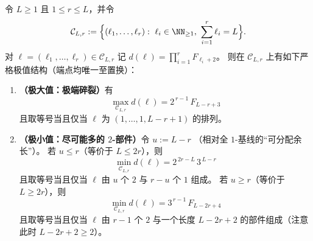 \begin{proposition}\label{prop:pom-multiplicity-fixed-r-extrema}
令 \(L\ge 1\) 且 \(1\le r\le L\)，并令
\[
\mathcal{C}_{L,r}:=\Bigl\{(\ell_1,\dots,\ell_r):\ \ell_i\in\NN_{\ge 1},\ \sum_{i=1}^r\ell_i=L\Bigr\}.
\]
对 \(\boldsymbol{\ell}=(\ell_1,\dots,\ell_r)\in\mathcal{C}_{L,r}\) 记
\(
d(\boldsymbol{\ell})=\prod_{i=1}^r F_{\ell_i+2}
\)。
则在 \(\mathcal{C}_{L,r}\) 上有如下严格极值结构（端点均唯一至置换）：
\begin{enumerate}
  \item \textbf{（极大值：极端碎裂）}有
  \begin{equation}\label{eq:pom-multiplicity-fixed-r-max}
  \boxed{\;\max_{\mathcal{C}_{L,r}} d(\boldsymbol{\ell})=2^{\,r-1}\,F_{L-r+3}\;}
  \end{equation}
  且取等号当且仅当 \(\boldsymbol{\ell}\) 为 \((1,\dots,1,L-r+1)\) 的排列。
  \item \textbf{（极小值：尽可能多的 \(2\)-部件）}令
  \(
  u:=L-r
  \)
  （相对全 \(1\)-基线的“可分配余长”）。
  若 \(u\le r\)（等价于 \(L\le 2r\)），则
  \begin{equation}\label{eq:pom-multiplicity-fixed-r-min-short}
  \boxed{\;\min_{\mathcal{C}_{L,r}} d(\boldsymbol{\ell})=2^{\,2r-L}\,3^{\,L-r}\;}
  \end{equation}
  且取等号当且仅当 \(\boldsymbol{\ell}\) 由 \(u\) 个 \(2\) 与 \(r-u\) 个 \(1\) 组成。
  若 \(u\ge r\)（等价于 \(L\ge 2r\)），则
  \begin{equation}\label{eq:pom-multiplicity-fixed-r-min-long}
  \boxed{\;\min_{\mathcal{C}_{L,r}} d(\boldsymbol{\ell})=3^{\,r-1}\,F_{L-2r+4}\;}
  \end{equation}
  且取等号当且仅当 \(\boldsymbol{\ell}\) 由 \(r-1\) 个 \(2\) 与一个长度 \(L-2r+2\) 的部件组成（注意此时 \(L-2r+2\ge 2\)）。
\end{enumerate}
\end{proposition}
